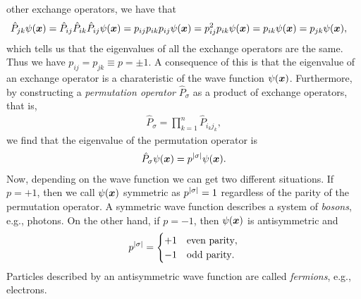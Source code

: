         other exchange operators, we have that
        \begin{align}
            \hat{P}_{jk} \psi(\boldsymbol{x})
            &= \hat{P}_{ij} \hat{P}_{ik} \hat{P}_{ij} \psi(\boldsymbol{x})
            = p_{ij} p_{ik} p_{ij} \psi(\boldsymbol{x})
            = p_{ij}^2 p_{ik} \psi(\boldsymbol{x})
            = p_{ik} \psi(\boldsymbol{x})
             = p_{jk} \psi(\boldsymbol{x}),
        \end{align}
        which tells us that the eigenvalues of all the exchange operators are
        the same.
        Thus we have $p_{ij} = p_{jk} \equiv p = \pm 1$.
        A consequence of this is that the eigenvalue of an exchange operator is
        a charateristic of the wave function $\psi(\boldsymbol{x})$.
        Furthermore, by constructing a \emph{permutation operator}
        $\hat{P}_{\sigma}$ as a product of exchange operators, that is,
        \begin{align}
            \hat{P}_{\sigma}
            = \prod_{k = 1}^{n} \hat{P}_{i_k j_k},
        \end{align}
        we find that the eigenvalue of the permutation operator is
        \begin{align}
            \hat{P}_{\sigma}\psi(\boldsymbol{x})
            = p^{\abs{\sigma}}\psi(\boldsymbol{x}).
        \end{align}
        Now, depending on the wave function we can get two different situations.
        If $p = +1$, then we call $\psi(\boldsymbol{x})$ symmetric as $p^{\abs{\sigma}}
        = 1$ regardless of the parity of the permutation operator.
        A symmetric wave function describes a system of \emph{bosons}, e.g.,
        photons.
        On the other hand, if $p = -1$, then $\psi(\boldsymbol{x})$ is antisymmetric
        and
        \begin{align}
            p^{\abs{\sigma}} =
            \begin{cases}
                +1 & \text{even parity}, \\
                -1 & \text{odd parity}.
            \end{cases}
        \end{align}
        Particles described by an antisymmetric wave function are called
        \emph{fermions}, e.g., electrons.


